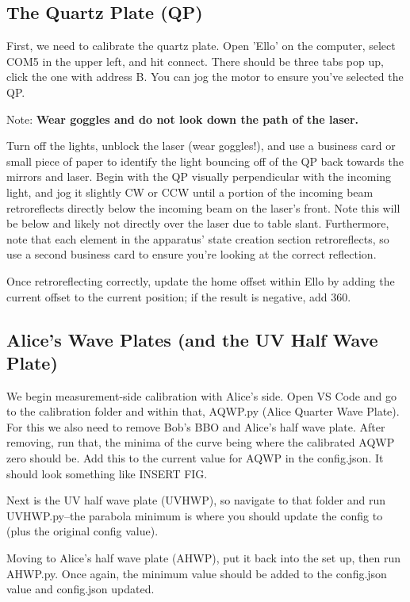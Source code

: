 \documentclass{paper}[11pt]
\begin{document}
\subsection{The Quartz Plate (QP)}
First, we need to calibrate the quartz plate. Open 'Ello' on the computer, select COM5 in the upper left, and hit connect. There should be three tabs pop up, click the one with address B. You can jog the motor to ensure you've selected the QP. 

Note: \textbf{Wear goggles and do not look down the path of the laser.}

Turn off the lights, unblock the laser (wear goggles!), and use a business card or small piece of paper to identify the light bouncing off of the QP back towards the mirrors and laser. Begin with the QP visually perpendicular with the incoming light, and jog it slightly CW or CCW until a portion of the incoming beam retroreflects directly below the incoming beam on the laser's front. Note this will be below and likely not directly over the laser due to table slant. Furthermore, note that each element in the apparatus' state creation section retroreflects, so use a second business card to ensure you're looking at the correct reflection.

Once retroreflecting correctly, update the home offset within Ello by adding the current offset to the current position; if the result is negative, add 360. 

\subsection{Alice's Wave Plates (and the UV Half Wave Plate)}
We begin measurement-side calibration with Alice's side. Open VS Code and go to the calibration folder and within that, AQWP.py (Alice Quarter Wave Plate). For this we also need to remove Bob's BBO and Alice's half wave plate. After removing, run that, the minima of the curve being where the calibrated AQWP zero should be. Add this to the current value for AQWP in the config.json. It should look something like INSERT FIG.

Next is the UV half wave plate (UVHWP), so navigate to that folder and run UVHWP.py--the parabola minimum is where you should update the config to (plus the original config value). 

Moving to Alice's half wave plate (AHWP), put it back into the set up, then run AHWP.py. Once again, the minimum value should be added to the config.json value and config.json updated. 
\end{document}
